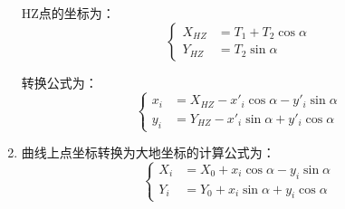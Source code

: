 \begin{enumerate}
HZ点的坐标为：
\[
\left \{ \begin{aligned}
X_{HZ} &= T_1 + T_2 \cos \alpha \\
Y_{HZ} &=  T_2 \sin \alpha 
\end{aligned} \right.
\]

转换公式为：
\[
\left \{ \begin{aligned}
x_i &= X_{HZ} - x'_i  \cos \alpha - y'_i \sin \alpha \\
y_i &= Y_{HZ}  -  x'_i \sin \alpha + y'_i \cos \alpha 
\end{aligned} \right.
\]

\item 曲线上点坐标转换为大地坐标的计算公式为：
\[
\left \{ \begin{aligned}
X_{i} &= X_0 + x_i \cos \alpha - y_i \sin \alpha \\
Y_{i} &= Y_0 + x_i \sin \alpha + y_i \cos \alpha 
\end{aligned} \right.
\]

\end{enumerate}